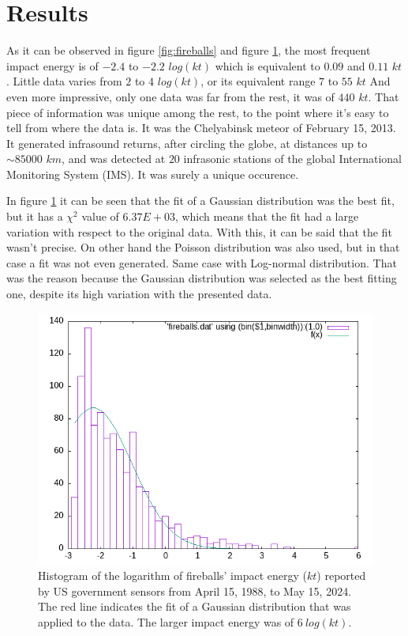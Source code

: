 \documentclass[
	a4paper, %
	10pt, %
	unnumberedsections, %
	twoside, %
]{LTJournalArticle}
\begin{document}
\section{Results}

As it can be observed in figure \ref{fig:fireballs} and figure \ref{fig:gaussian}, the most frequent
impact energy is of $-2.4$ to $-2.2$ $log(kt)$ which is equivalent to $0.09$ and $0.11$ $kt$. Little
data varies from $2$ to $4$ $log(kt)$, or its equivalent range $7$ to $55$ $kt$ And even more
impressive, only one data was far from the rest, it was of $440$ $kt$. That piece of information was
unique among the rest, to the point where it's easy to tell from where the data is. It was the
Chelyabinsk meteor of February 15, 2013. It generated infrasound returns, after circling the globe,
at distances up to $\sim85000$ $km$, and was detected at $20$ infrasonic stations of the global
International Monitoring System (IMS). \supercite{rusia2013} It was surely a unique occurence.

In figure \ref{fig:gaussian} it can be seen that the fit of a Gaussian distribution was the best fit,
but it has a $\chi^2$ value of $6.37E+03$, which means that the fit had a large variation with respect to
the original data. With this, it can be said that the fit wasn't precise. On other hand the Poisson
distribution was also used, but in that case a fit was not even generated. Same case with Log-normal
distribution. That was the reason because the Gaussian distribution was selected as the best fitting
one, despite its high variation with the presented data.

\begin{figure}[H] %
	\includegraphics[width=\linewidth]{fit.png}
	\caption{Histogram of the logarithm of fireballs' impact energy ($kt$) reported by US government sensors from April 15, 1988, to May 15, 2024. The red line indicates the fit of a Gaussian distribution that was applied to the data. The larger impact energy was of $6\:log(kt)$.}
	\label{fig:gaussian}
\end{figure}
\end{document}
